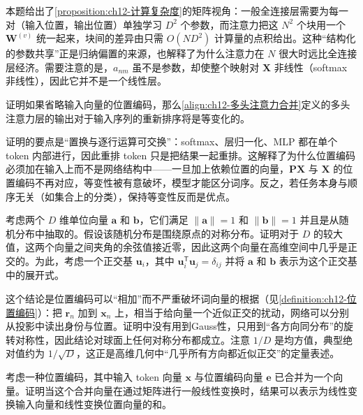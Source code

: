 \documentclass[../../main.tex]{subfiles}
\begin{document}
\begin{remark}
本题给出了\cref{proposition:ch12-计算复杂度}的矩阵视角：一般全连接层需要为每一对（输入位置，输出位置）单独学习 $D^{2}$ 个参数，而注意力把这 $N^{2}$ 个块用一个 $\mathbf{W}^{(v)}$ 统一起来，块间的差异由只需 $O(ND^{2})$ 计算量的点积给出。这种“结构化的参数共享”正是归纳偏置的来源，也解释了为什么注意力在 $N$ 很大时远比全连接层经济。需要注意的是，$a_{nm}$ 虽不是参数，却使整个映射对 $\mathbf{X}$ 非线性（softmax 非线性），因此它并不是一个线性层。
\end{remark}

\begin{exercise}[（$\star$）]\label{exercise:ch12-07}
证明如果省略输入向量的位置编码，那么\eqref{align:ch12-多头注意力合并}定义的多头注意力层的输出对于输入序列的重新排序将是等变化的。
\end{exercise}

\begin{remark}
证明的要点是“置换与逐行运算可交换”：softmax、层归一化、MLP 都在单个 token 内部进行，因此重排 token 只是把结果一起重排。这解释了为什么位置编码必须加在输入上而不是网络结构中——一旦加上依赖位置的向量，$\mathbf{P}\mathbf{X}$ 与 $\mathbf{X}$ 的位置编码不再对应，等变性被有意破坏，模型才能区分词序。反之，若任务本身与顺序无关（如集合上的分类），保持等变性反而是优点。
\end{remark}

\begin{exercise}\label{exercise:ch12-08}
考虑两个 $D$ 维单位向量 $\mathbf{a}$ 和 $\mathbf{b}$，它们满足 $\|\mathbf{a}\|=1$ 和 $\|\mathbf{b}\|=1$ 并且是从随机分布中抽取的。假设该随机分布是围绕原点的对称分布。证明对于 $D$ 的较大值，这两个向量之间夹角的余弦值接近零，因此这两个向量在高维空间中几乎是正交的。为此，考虑一个正交基 $\mathbf{u}_i$，其中 $\mathbf{u}_i^{\mathsf{T}}\mathbf{u}_j=\delta_{ij}$ 并将 $\mathbf{a}$ 和 $\mathbf{b}$ 表示为这个正交基中的展开式。
\end{exercise}

\begin{remark}
这个结论是位置编码可以“相加”而不严重破坏词向量的根据（见\cref{definition:ch12-位置编码}）：把 $\mathbf{r}_n$ 加到 $\mathbf{x}_n$ 上，相当于给向量一个近似正交的扰动，网络可以分别从投影中读出身份与位置。证明中没有用到Gauss性，只用到“各方向同分布”的旋转对称性，因此结论对球面上任何对称分布都成立。注意 $1/D$ 是均方值，典型绝对值约为 $1/\sqrt{D}$，这正是高维几何中“几乎所有方向都近似正交”的定量表述。
\end{remark}

\begin{exercise}\label{exercise:ch12-09}
考虑一种位置编码，其中输入 token 向量 $\mathbf{x}$ 与位置编码向量 $\mathbf{e}$ 已合并为一个向量。证明当这个合并向量在通过矩阵进行一般线性变换时，结果可以表示为线性变换输入向量和线性变换位置向量的和。
\end{exercise}
\end{document}
